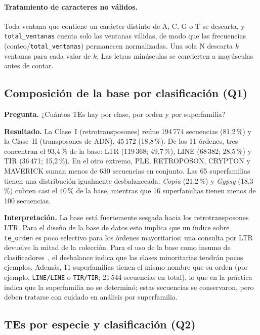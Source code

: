 \paragraph{Tratamiento de caracteres no válidos.}
Toda ventana que contiene un carácter distinto de A, C, G o T se
descarta, y \texttt{total\_ventanas} cuenta solo las ventanas válidas,
de modo que las frecuencias (conteo/\texttt{total\_ventanas}) permanecen
normalizadas. Una sola N descarta $k$ ventanas para cada valor de $k$.
Las letras minúsculas se convierten a mayúsculas antes de contar.
 
\subsection{Composición de la base por clasificación (Q1)}
 
\textbf{Pregunta.} ¿Cuántos TEs hay por clase, por orden y por superfamilia?
 
\textbf{Resultado.} La Clase~I (retrotransposones) reúne 194\,774 secuencias
(81,2\,\%) y la Clase~II (transposones de ADN), 45\,172 (18,8\,\%). De los
11 órdenes, tres concentran el 93,4\,\% de la base: LTR (119\,368; 49,7\,\%),
LINE (68\,382; 28,5\,\%) y TIR (36\,471; 15,2\,\%). En el otro extremo,
PLE, RETROPOSON, CRYPTON y MAVERICK suman menos de 630 secuencias en
conjunto. Las 65 superfamilias tienen una distribución igualmente
desbalanceada: \textit{Copia} (21,2\,\%) y \textit{Gypsy} (18,3\,\%) cubren
casi el 40\,\% de la base, mientras que 16 superfamilias tienen menos de
100 secuencias.
 
\textbf{Interpretación.} La base está fuertemente sesgada hacia los
retrotransposones LTR. Para el diseño de la base de datos esto implica que
un índice sobre \texttt{te\_orden} es poco selectivo para los órdenes
mayoritarios: una consulta por LTR devuelve la mitad de la colección. Para
el uso de la base como insumo de clasificadores~\cite{orozcoarias2026panteon},
el desbalance indica que las clases minoritarias tendrán pocos ejemplos.
Además, 11 superfamilias tienen el mismo nombre que su orden (por ejemplo,
\texttt{LINE/LINE} o \texttt{TIR/TIR}; 21\,544 secuencias en total), lo que
en la práctica indica que la superfamilia no se determinó; estas secuencias
se conservaron, pero deben tratarse con cuidado en análisis por superfamilia.
 
\subsection{TEs por especie y clasificación (Q2)}
 
